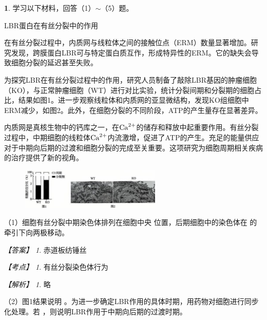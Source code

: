 \documentclass[UTF8, 10pt, a4paper, oneside]{ctexart}
\newcommand{\blank}{ \underbar{\quad$\blacktriangle$\quad} }%
\newcommand{\fs}[1]{{\fangsong #1}}%
\newcommand{\hei}[1]{{\heiti #1}}
\theoremstyle{definition}
\newtheorem{exercise}{}
\theoremstyle{remark}
\newtheorem*{answer}{【答案】}
\newtheorem*{point}{【考点】}      %
\newtheorem*{explanation}{【解析】}     %
\theoremstyle{plain}
\begin{document}
\begin{exercise}
    学习以下材料，回答（1）$\sim$（5）题。
    \begin{center}\vspace{-1em}
        \hei{LBR蛋白在有丝分裂中的作用}
    \end{center}\vspace{-0.5em}
    {\kaishu

    在有丝分裂过程中，内质网与线粒体之间的接触位点（ERM）数量显著增加。研究发现，跨膜蛋白LBR可与特定蛋白质互作，形成特异性的ERM。它的缺失会导致细胞分裂的延迟甚至失败。

    为探究LBR在有丝分裂过程中的作用，研究人员制备了敲除LBR基因的肿瘤细胞（KO），与正常肿瘤细胞（WT）进行对比实验，统计分裂间期和分裂期的细胞占比，结果如图1。进一步观察线粒体和内质网的亚显微结构，发现KO组细胞中ERM减少，如图2。此外，在细胞分裂的不同阶段，ATP的产生量存在显著差异。

    内质网是真核生物中的钙库之一，在$\ce{Ca^2+}$的储存和释放中起重要作用。有丝分裂过程中，中期细胞的线粒体$\ce{Ca^2+}$内流激增，促进了ATP的产生。充足的能量供应对于中期向后期的过渡和细胞分裂的完成至关重要。这项研究为细胞周期相关疾病的治疗提供了新的视角。
    }
    \begin{figure}[h!]
        \centering
        \includegraphics[width=0.6\textwidth]{assists/17-1.jpg}
    \end{figure}\vspace{-1em}

    （1）细胞有丝分裂中期染色体排列在细胞中央\blank 位置，后期细胞中的染色体在\blank 的牵引下向两极移动。

    \begin{answer}
        赤道板\qquad 纺锤丝
    \end{answer}
    \begin{point}
        有丝分裂染色体行为
    \end{point}
    \begin{explanation}
        \fs{略}
    \end{explanation}

    （2）图1结果说明\blank 。为进一步确定LBR作用的具体时期，用药物对细胞进行同步化处理。若\blank ，则说明LBR作用于中期向后期的过渡时期。


\end{exercise}
\end{document}
